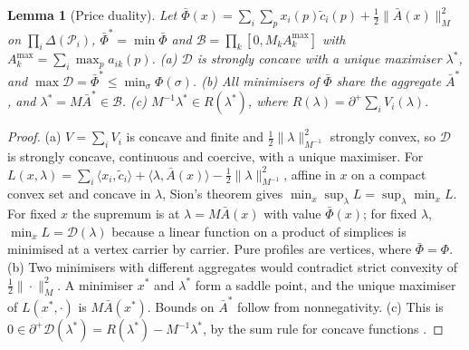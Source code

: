 \documentclass[preprint,11pt]{elsarticle}
\newtheorem{lemma}[theorem]{Lemma}
\theoremstyle{definition}
\theoremstyle{remark}
\newcommand{\cP}{\mathcal{P}}
\newcommand{\Abar}{\bar A}
\newcommand{\Amax}{A^{\max}}
\newcommand{\ip}[2]{\langle #1,#2\rangle}
\newcommand{\sd}{\partial^{+}}
\begin{document}
\begin{lemma}[Price duality]\label{lem:dual}
Let $\bar\Phi(x)=\sum_i\sum_px_i(p)\tilde c_i(p)+\tfrac12\|\Abar(x)\|_M^2$ on $\prod_i\Delta(\cP_i)$, $\bar\Phi^*=\min\bar\Phi$ and $\mathcal B=\prod_k[0,M_k\Amax_k]$ with $\Amax_k=\sum_i\max_pa_{ik}(p)$. (a) $\mathcal D$ is strongly concave with a unique maximiser $\lambda^*$, and $\max\mathcal D=\bar\Phi^*\le\min_\sigma\Phi(\sigma)$. (b) All minimisers of $\bar\Phi$ share the aggregate $\Abar^*$, and $\lambda^*=M\Abar^*\in\mathcal B$. (c) $M^{-1}\lambda^*\in R(\lambda^*)$, where $R(\lambda)=\sd\sum_iV_i(\lambda)$.
\end{lemma}
\begin{proof}
(a) $V=\sum_iV_i$ is concave and finite and $\tfrac12\|\lambda\|^2_{M^{-1}}$ strongly convex, so $\mathcal D$ is strongly concave, continuous and coercive, with a unique maximiser. For $L(x,\lambda)=\sum_i\ip{x_i}{\tilde c_i}+\ip{\lambda}{\Abar(x)}-\tfrac12\|\lambda\|^2_{M^{-1}}$, affine in $x$ on a compact convex set and concave in $\lambda$, Sion's theorem gives $\min_x\sup_\lambda L=\sup_\lambda\min_xL$. For fixed $x$ the supremum is at $\lambda=M\Abar(x)$ with value $\bar\Phi(x)$; for fixed $\lambda$, $\min_xL=\mathcal D(\lambda)$ because a linear function on a product of simplices is minimised at a vertex carrier by carrier. Pure profiles are vertices, where $\bar\Phi=\Phi$. (b) Two minimisers with different aggregates would contradict strict convexity of $\tfrac12\|\cdot\|_M^2$. A minimiser $x^*$ and $\lambda^*$ form a saddle point, and the unique maximiser of $L(x^*,\cdot)$ is $M\Abar(x^*)$. Bounds on $\Abar^*$ follow from nonnegativity. (c) This is $0\in\sd\mathcal D(\lambda^*)=R(\lambda^*)-M^{-1}\lambda^*$, by the sum rule for concave functions \citep{Rockafellar1970}.
\end{proof}
\end{document}
